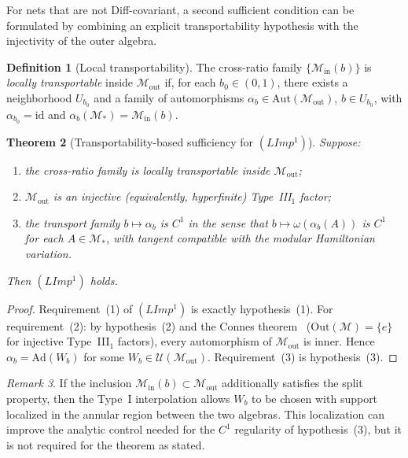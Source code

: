 \documentclass[12pt]{article}
\newtheorem{theorem}{Theorem}[section]
\theoremstyle{definition}
\newtheorem{definition}[theorem]{Definition}
\theoremstyle{remark}
\newtheorem{remark}[theorem]{Remark}
\begin{document}
For nets that are not Diff-covariant, a second sufficient condition can be formulated by combining an explicit transportability hypothesis with the injectivity of the outer algebra.

\begin{definition}[Local transportability]\label{def:local-transport}
The cross-ratio family $\{\mathcal{M}_{\mathrm{in}}(b)\}$ is \emph{locally transportable} inside $\mathcal{M}_{\mathrm{out}}$ if, for each $b_0 \in (0,1)$, there exists a neighborhood $U_{b_0}$ and a family of automorphisms $\alpha_b \in \mathrm{Aut}(\mathcal{M}_{\mathrm{out}})$, $b \in U_{b_0}$, with $\alpha_{b_0} = \mathrm{id}$ and $\alpha_b(\mathcal{M}_*) = \mathcal{M}_{\mathrm{in}}(b)$.
\end{definition}

\begin{theorem}[Transportability-based sufficiency for $(LImp^1)$]\label{thm:transport-limp}
Suppose:
\begin{enumerate}
\item the cross-ratio family is locally transportable inside $\mathcal{M}_{\mathrm{out}}$;
\item $\mathcal{M}_{\mathrm{out}}$ is an injective (equivalently, hyperfinite) Type~III$_1$ factor;
\item the transport family $b \mapsto \alpha_b$ is $C^1$ in the sense that $b \mapsto \omega(\alpha_b(A))$ is $C^1$ for each $A \in \mathcal{M}_*$, with tangent compatible with the modular Hamiltonian variation.
\end{enumerate}
Then $(LImp^1)$ holds.
\end{theorem}

\begin{proof}
Requirement~(1) of $(LImp^1)$ is exactly hypothesis~(1). For requirement~(2): by hypothesis~(2) and the Connes theorem~\cite{Takesaki2003} ($\mathrm{Out}(\mathcal{M}) = \{e\}$ for injective Type~III$_1$ factors), every automorphism of $\mathcal{M}_{\mathrm{out}}$ is inner. Hence $\alpha_b = \mathrm{Ad}(W_b)$ for some $W_b \in \mathcal{U}(\mathcal{M}_{\mathrm{out}})$. Requirement~(3) is hypothesis~(3).
\end{proof}

\begin{remark}
If the inclusion $\mathcal{M}_{\mathrm{in}}(b) \subset \mathcal{M}_{\mathrm{out}}$ additionally satisfies the split property, then the Type~I interpolation allows $W_b$ to be chosen with support localized in the annular region between the two algebras. This localization can improve the analytic control needed for the $C^1$ regularity of hypothesis~(3), but it is not required for the theorem as stated.
\end{remark}
\end{document}
